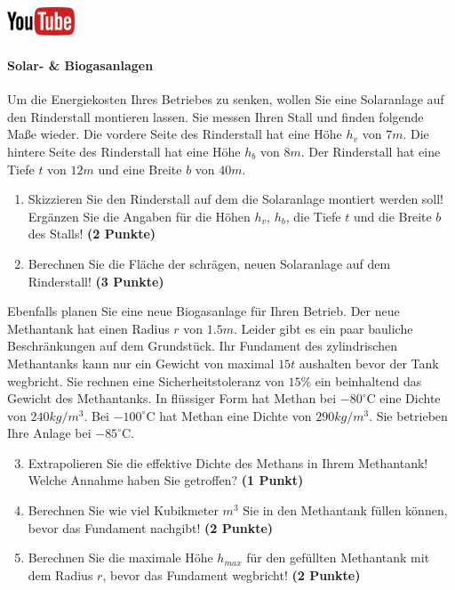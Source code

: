 \documentclass[a4paper, 10pt]{scrartcl}\usepackage[]{graphicx}\usepackage[]{xcolor}
\begin{document}
\hfill\href{https://youtu.be/aBxLkdF-c4M}{\includegraphics[width =
  2cm]{img/youtube}} %
\hspace{2Ex}

\paragraph{Solar- \& Biogasanlagen}



Um die Energiekosten Ihres Betriebes zu senken, wollen Sie eine Solaranlage
auf den Rinderstall montieren lassen. Sie messen Ihren Stall und finden
folgende Ma{\ss}e wieder. Die vordere Seite des Rinderstall hat eine H{\"o}he
$h_v$ von $7m$. Die hintere Seite des Rinderstall hat eine
H{\"o}he $h_b$ von $8m$. Der Rinderstall hat eine Tiefe $t$ von
$12m$ und eine Breite $b$ von $40m$.

\begin{enumerate}
\item Skizzieren Sie den Rinderstall auf dem die Solaranlage montiert
  werden soll! Erg{\"a}nzen Sie die Angaben f{\"u}r die H{\"o}hen $h_v$, $h_b$, die
  Tiefe $t$ und die Breite $b$ des Stalls!  \textbf{(2 Punkte)}
\item Berechnen Sie die Fl{\"a}che der schr{\"a}gen, neuen Solaranlage auf dem
  Rinderstall! \textbf{(3 Punkte)}
\end{enumerate}

Ebenfalls planen Sie eine neue Biogasanlage f{\"u}r Ihren Betrieb. Der neue
Methantank hat einen Radius $r$ von $1.5m$. Leider gibt es ein
paar bauliche Beschr{\"a}nkungen auf dem Grundst{\"u}ck. Ihr Fundament des
zylindrischen Methantanks kann nur ein Gewicht von maximal
$15t$ aushalten bevor der Tank wegbricht. Sie rechnen eine
Sicherheitstoleranz von $15\%$ ein beinhaltend das Gewicht des
Methantanks. In fl{\"u}ssiger Form hat
Methan bei $-80^\circ\text{C}$ eine Dichte von
$240kg/m^3$. Bei $-100^\circ\text{C}$ hat Methan eine Dichte
von $290kg/m^3$. Sie betrieben Ihre Anlage bei
$-85^\circ\text{C}$.

\begin{enumerate}
  \setcounter{enumi}{2}
\item Extrapolieren Sie die effektive Dichte des Methans in Ihrem
  Methantank! Welche Annahme haben Sie getroffen? \textbf{(1 Punkt)}
\item Berechnen Sie wie viel Kubikmeter $m^3$ Sie in den Methantank f{\"u}llen
  k{\"o}nnen, bevor das Fundament nachgibt! \textbf{(2 Punkte)}
\item Berechnen Sie die maximale H{\"o}he $h_{max}$ f{\"u}r den gef{\"u}llten
  Methantank mit dem Radius $r$, bevor das Fundament wegbricht! \textbf{(2
    Punkte)}
\end{enumerate}
\end{document}

